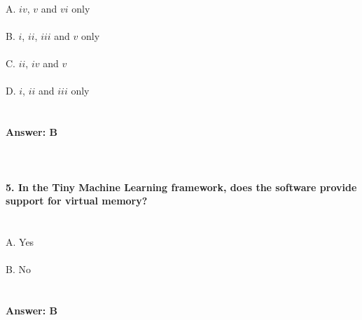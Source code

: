 \documentclass[prl,twocolumn,showpacs,preprintnumbers,superscriptaddress]{revtex4}
\theoremstyle{plain}
\theoremstyle{definition}
\begin{document}
\begin{widetext}
\\
\\
\\
A. $iv$, $v$ and $vi$ only
\\
\\
B. $i$, $ii$, $iii$ and $v$ only
\\
\\
C. $ii$, $iv$ and $v$ 
\\
\\
D. $i$, $ii$ and $iii$ only
\\
\\
\\
\textbf{Answer: B}
\\
\\
\\
\\
\textbf{5. In the Tiny Machine Learning framework, does the software provide support for virtual memory?}
\\
\\
\\
A. Yes
\\
\\
B. No
\\
\\
\\
\textbf{Answer: B}
\\
\\
\\
\\
\\
\\
\\
\\
\\
\end{widetext}
\end{document}

